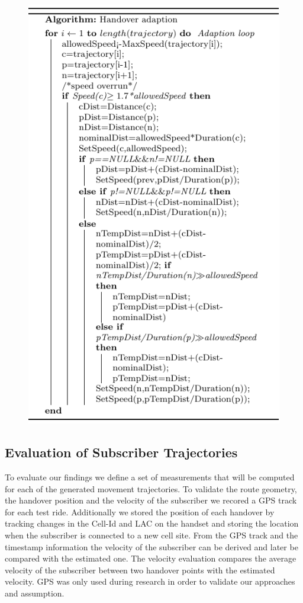 \documentclass[twocolumn]{bmcart}%
\begin{document}
\begin{figure}[!t]
	\includegraphics{adaptionalg}
\end{figure}
\subsection*{Evaluation of Subscriber Trajectories}
To evaluate our findings we define a set of measurements that will be computed for each of the generated movement trajectories. To validate the route geometry, the handover position and the velocity of the subscriber we recored a GPS track for each test ride. Additionally we stored the position of each handover by tracking changes in the Cell-Id and LAC on the handset and storing the location when the subscriber is connected to a new cell site. From the GPS track and the timestamp information the velocity of the subscriber can be derived and later be compared with the estimated one. The velocity evaluation compares  the average velocity of the subscriber between two handover points with the estimated velocity. GPS was only used during research in order to validate our approaches and assumption.
\end{document}

